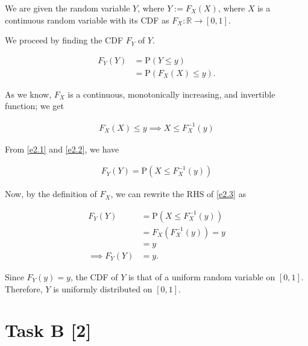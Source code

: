 We are given the random variable $Y$, where $Y:= F_X(X)$, where $X$ is a
continuous random variable with its CDF as $F_X: \mathbb{R} \xrightarrow{}
[0, 1]$.

We proceed by finding the CDF $F_Y$ of $Y$.

\begin{equation}
    \begin{aligned}
        F_Y(Y)
        &= \text{P}(Y \le y) \\
        &= \text{P}(F_X(X) \le y).
    \end{aligned}
    \label{e2.1}
\end{equation}

As we know, $F_X$ is a continuous, monotonically increasing, and invertible
function; we get

\begin{equation}
    \begin{aligned}
        F_X(X) \le y \implies X \le F_X^{-1}(y)
    \end{aligned}
    \label{e2.2}
\end{equation}

From \ref{e2.1} and \ref{e2.2}, we have

\begin{equation}
    \begin{aligned}
        F_Y(Y) = \text{P}(X \le F_X^{-1}(y))
    \end{aligned}
    \label{e2.3}
\end{equation}

Now, by the definition of $F_X$, we can rewrite the RHS of \ref{e2.3} as

\begin{equation}
    \begin{aligned}
        F_Y(Y) &= \text{P}(X \le F_X^{-1}(y)) \\ 
        &= F_X(F_X^{-1}(y)) = y \\
        &= y \\
        \implies F_Y(Y) &= y.
    \end{aligned}
    \label{e2.4}
\end{equation}

Since $F_Y(y) = y$, the CDF of $Y$ is that of a uniform random variable on
$[0, 1]$. Therefore, $Y$ is uniformly distributed on $[0, 1]$.

\section*{\colS{$\S$} Task B \hfill \normalfont \large [2]}

